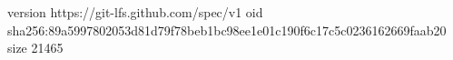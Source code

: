 version https://git-lfs.github.com/spec/v1
oid sha256:89a5997802053d81d79f78beb1bc98ee1e01c190f6c17c5c0236162669faab20
size 21465
